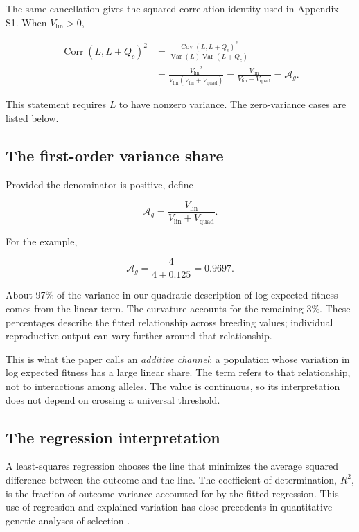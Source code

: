 \documentclass[11pt]{article}
\newcommand{\Var}{\operatorname{Var}}
\newcommand{\Cov}{\operatorname{Cov}}
\newcommand{\Corr}{\operatorname{Corr}}
\newcommand{\Ag}{\ensuremath{\mathcal A_g}}
\newcommand{\Vlin}{\ensuremath{V_{\mathrm{lin}}}}
\newcommand{\Vquad}{\ensuremath{V_{\mathrm{quad}}}}
\begin{document}
The same cancellation gives the squared-correlation identity used in
Appendix S1.  When $\Vlin>0$,

\begin{align}
\Corr(L,L+Q_c)^2
&=\frac{\Cov(L,L+Q_c)^2}
{\Var(L)\Var(L+Q_c)}\nonumber\\
&=\frac{\Vlin^2}{\Vlin(\Vlin+\Vquad)}
=\frac{\Vlin}{\Vlin+\Vquad}=\Ag.
\label{eq:guide-correlation}
\end{align}

This statement requires $L$ to have nonzero variance.  The zero-variance
cases are listed below.

\subsection{The first-order variance share}

Provided the denominator is positive, define

\begin{equation}
\Ag=\frac{\Vlin}{\Vlin+\Vquad}.
\label{eq:Ag}
\end{equation}

For the example,

\begin{equation}
\Ag=\frac{4}{4+0.125}=0.9697.
\end{equation}

About 97\% of the variance in our quadratic description of log expected fitness comes from the linear term. The curvature accounts for the remaining 3\%. These percentages describe the fitted relationship across breeding values; individual reproductive output can vary further around that relationship.

This is what the paper calls an \emph{additive channel}: a population whose variation in log expected fitness has a large linear share. The term refers to that relationship, not to interactions among alleles. The value is continuous, so its interpretation does not depend on crossing a universal threshold.

\subsection{The regression interpretation}

A least-squares regression chooses the line that minimizes the average squared
difference between the outcome and the line.  The coefficient of
determination, $R^2$, is the fraction of outcome variance accounted for by the
fitted regression.  This use of regression and explained variation has close
precedents in quantitative-genetic analyses of selection
\citep{LandeArnold1983,MooradWade2013}.
\end{document}

